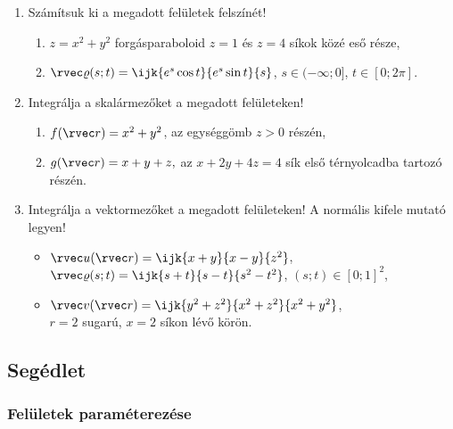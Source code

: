 \documentclass[a4paper, 12pt]{scrartcl}
\newcommand\coordv{\rvec r}
\newcommand\surfv{\rvec \varrho}
\begin{document}
\begin{enumerate}
  \item Számítsuk ki a megadott felületek felszínét!
        \begin{enumerate}
          \item $z = x^2 + y^2$ forgásparaboloid $z = 1$ és $z = 4$ síkok közé
                eső része,

          \item $\surfv(s;t) = \ijk{e^s \cos t}{e^s \sin t}{s}$,
                $s \in (-\infty; 0]$, $t \in [0; 2\pi]$.
        \end{enumerate}

  \item Integrálja a skalármezőket a megadott felületeken!
        \begin{enumerate}
          \item $f(\coordv) = x^2 + y^2$, az egységgömb $z > 0$ részén,

          \item $g(\coordv) = x + y + z, $ az $x + 2y + 4z = 4$ sík
                első térnyolcadba tartozó részén.
        \end{enumerate}

  \item Integrálja a vektormezőket a megadott felületeken!
        A normális kifele mutató legyen!
        \begin{itemize}
          \item $\rvec u(\coordv) = \ijk{x + y}{x - y}{z^2}$,\\
                $\surfv (s;t) = \ijk{s + t}{s - t}{s^2 - t^2}$,
                $(s;t) \in [0;1]^2$,

          \item $\rvec v(\coordv) = \ijk{y^2 + z^2}{x^2 + z^2}{x^2 + y^2}$,\\
                $r = 2$ sugarú, $x = 2$ síkon lévő körön.
        \end{itemize}
\end{enumerate}

\clearpage
\subsection{Segédlet}

\subsubsection{Felületek paraméterezése}
\end{document}
